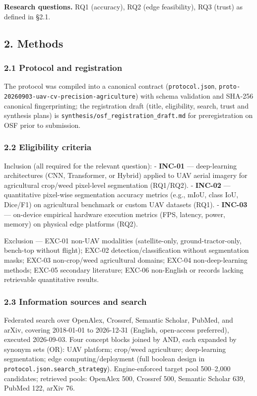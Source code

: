 \documentclass[11pt]{article}
\begin{document}
\textbf{Research questions.} RQ1 (accuracy), RQ2 (edge feasibility), RQ3
(trust) as defined in §2.1.

\subsection{2. Methods}\label{methods}

\subsubsection{2.1 Protocol and
registration}\label{protocol-and-registration}

The protocol was compiled into a canonical contract
(\texttt{protocol.json},
\texttt{proto-20260903-uav-cv-precision-agriculture}) with schema
validation and SHA-256 canonical fingerprinting; the registration draft
(title, eligibility, search, trust and synthesis plans) is
\texttt{synthesis/osf\_registration\_draft.md} for preregistration on
OSF prior to submission.

\subsubsection{2.2 Eligibility criteria}\label{eligibility-criteria}

Inclusion (all required for the relevant question): - \textbf{INC-01}
--- deep-learning architectures (CNN, Transformer, or Hybrid) applied to
UAV aerial imagery for agricultural crop/weed pixel-level segmentation
(RQ1/RQ2). - \textbf{INC-02} --- quantitative pixel-wise segmentation
accuracy metrics (e.g., mIoU, class IoU, Dice/F1) on agricultural
benchmark or custom UAV datasets (RQ1). - \textbf{INC-03} --- on-device
empirical hardware execution metrics (FPS, latency, power, memory) on
physical edge platforms (RQ2).

Exclusion --- EXC-01 non-UAV modalities (satellite-only,
ground-tractor-only, bench-top without flight); EXC-02
detection/classification without segmentation masks; EXC-03
non-crop/weed agricultural domains; EXC-04 non-deep-learning methods;
EXC-05 secondary literature; EXC-06 non-English or records lacking
retrievable quantitative results.

\subsubsection{2.3 Information sources and
search}\label{information-sources-and-search}

Federated search over OpenAlex, Crossref, Semantic Scholar, PubMed, and
arXiv, covering 2018-01-01 to 2026-12-31 (English, open-access
preferred), executed 2026-09-03. Four concept blocks joined by AND, each
expanded by synonym sets (OR): UAV platform; crop/weed agriculture;
deep-learning segmentation; edge computing/deployment (full boolean
design in \texttt{protocol.json.search\_strategy}). Engine-enforced
target pool 500--2,000 candidates; retrieved pools: OpenAlex 500,
Crossref 500, Semantic Scholar 639, PubMed 122, arXiv 76.
\end{document}
